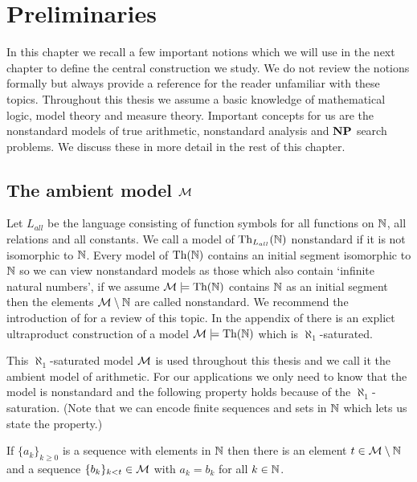 \chapter*{Preliminaries}

In this chapter we recall a few important notions which we will use in the next chapter to define the central construction we study. We do not review the notions formally but always provide a reference for the reader unfamiliar with these topics. Throughout this thesis we assume a basic knowledge of mathematical logic, model theory and measure theory. Important concepts for us are the nonstandard models of true arithmetic, nonstandard analysis and $\textbf{NP}$ search problems. We discuss these in more detail in the rest of this chapter.

\section*{The ambient model $\mathcal{M}$}

Let $L_{all}$ be the language consisting of function symbols for all functions on $\mathbb{N}$, all relations and all constants. We call a model of $\text{Th}_{L_{all}}(\mathbb{N})$ nonstandard if it is not isomorphic to $\mathbb{N}$. Every model of $\text{Th}(\mathbb{N})$ contains an initial segment isomorphic to $\mathbb{N}$ so we can view nonstandard models as those which also contain `infinite natural numbers', if we assume $\mathcal{M}\models \text{Th}(\mathbb{N})$ contains $\mathbb{N}$ as an initial segment then the elements $\mathcal{M}\setminus \mathbb{N}$ are called nonstandard. We recommend the introduction of \cite{kaye1991pa} for a review of this topic. In the appendix of \cite{krajicek2010forcing} there is an explict ultraproduct construction of a model $\mathcal{M}\models \text{Th}(\mathbb{N})$ which is $\aleph_1$-saturated.

This $\aleph_1$-saturated model $\mathcal{M}$ is used throughout this thesis and we call it the ambient model of arithmetic. For our applications we only need to know that the model is nonstandard and the following property holds because of the $\aleph_1$-saturation. (Note that we can encode finite sequences and sets in $\mathbb{N}$ which lets us state the property.)

\begin{prope}
If $\{a_k\}_{k\geq 0}$ is a sequence with elements in $\mathbb{N}$ then there is an element $t\in \mathcal{M} \setminus \mathbb{N}$ and a sequence $\{b_k\}_{k<t}\in \mathcal{M}$ with $a_k=b_k$ for all $k\in \mathbb{N}$.
\end{prope}

